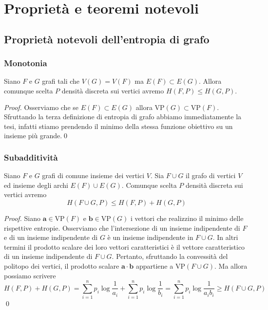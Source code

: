 \chapter{Proprietà e teoremi notevoli}
\section{Proprietà notevoli dell'entropia di grafo}
\subsection{Monotonia} 
\begin{lemma}
	Siano \(F\) e \(G\) grafi tali che \(V(G)=V(F)\) ma \(E(F)\subset E(G)\). Allora comunque scelta \(P\) densità discreta sui vertici avremo \(H(F,P)\le H(G,P)\). 
\end{lemma}
\begin{proof}
	Osserviamo che se \(E(F)\subset E(G)\) allora \(\text{VP}(G)\subset \text{VP}(F)\). Sfruttando la terza definizione di entropia di grafo abbiamo immediatamente la tesi, infatti stiamo prendendo il minimo della stessa funzione obiettivo su un insieme più grande.\qed 
\end{proof}

\subsection{Subadditività} 
\begin{lemma}
	Siano \(F\) e \(G\) grafi di comune insieme dei vertici \(V\). Sia \(F\cup G\) il grafo di vertici \(V\) ed insieme degli archi \(E(F)\cup E(G)\). Comunque scelta \(P\) densità discreta sui vertici avremo
	\[H(F\cup G,P)\le H(F,P)+H(G,P)\]
\end{lemma}
\begin{proof}
	Siano \(\mathbf{a}\in \text{VP}(F)\) e \(\mathbf{b}\in \text{VP}(G)\) i vettori che realizzino il minimo delle rispettive entropie. Osserviamo che l'intersezione di un insieme indipendente di \(F\) e di un insieme indipendente di \(G\) è un insieme indipendente in \(F\cup G\). In altri termini il prodotto scalare dei loro vettori caratteristici è il vettore caratteristico di un insieme indipendente di \(F\cup G\). Pertanto, sfruttando la convessità del politopo dei vertici, il prodotto scalare \(\mathbf{a}\cdot \mathbf{b}\) appartiene a \(\text{VP}(F\cup G)\). Ma allora possiamo scrivere
	\[H(F,P)+H(G,P)=\sum_{i=1}^n p_i\log{\frac{1}{a_i}}+\sum_{i=1}^n p_i\log{\frac{1}{b_i}}=\sum_{i=1}^n p_i\log{\frac{1}{a_{i}b_{i}}}\ge H(F\cup G,P)\]
	\qed 
\end{proof}


